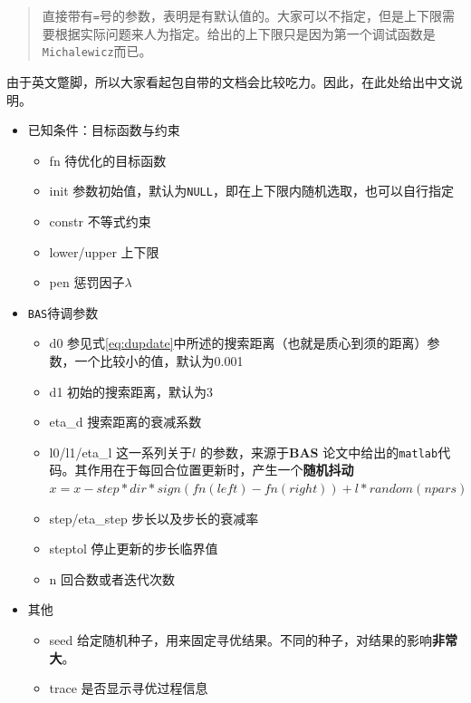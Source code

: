 \documentclass[]{ctexbook}
\providecommand{\tightlist}{%
  \setlength{\itemsep}{0pt}\setlength{\parskip}{0pt}}
\theoremstyle{definition}
\theoremstyle{definition}
\theoremstyle{definition}
\theoremstyle{remark}
\begin{document}
\begin{quote}
直接带有\texttt{=}号的参数，表明是有默认值的。大家可以不指定，但是上下限需要根据实际问题来人为指定。给出的上下限只是因为第一个调试函数是\texttt{Michalewicz}而已。
\end{quote}

由于英文蹩脚，所以大家看起包自带的文档会比较吃力。因此，在此处给出中文说明。

\begin{itemize}
\tightlist
\item
  已知条件：目标函数与约束

  \begin{itemize}
  \tightlist
  \item
    fn 待优化的目标函数
  \item
    init
    参数初始值，默认为\texttt{NULL}，即在上下限内随机选取，也可以自行指定
  \item
    constr 不等式约束
  \item
    lower/upper 上下限
  \item
    pen 惩罚因子\(\lambda\)
  \end{itemize}
\item
  \texttt{BAS}待调参数

  \begin{itemize}
  \tightlist
  \item
    d0
    参见式\eqref{eq:dupdate}中所述的搜索距离（也就是质心到须的距离）参数，一个比较小的值，默认为0.001
  \item
    d1 初始的搜索距离，默认为3
  \item
    eta\_d 搜索距离的衰减系数
  \item
    l0/l1/eta\_l 这一系列关于\(l\) 的参数，来源于\textbf{BAS}
    \citep{Jiang2017BAS}论文中给出的\texttt{matlab}代码。其作用在于每回合位置更新时，产生一个\textbf{随机抖动}\(x = x - step * dir * sign(fn(left) - fn(right)) + l *random(npars)\)
  \item
    step/eta\_step 步长以及步长的衰减率
  \item
    steptol 停止更新的步长临界值
  \item
    n 回合数或者迭代次数
  \end{itemize}
\item
  其他

  \begin{itemize}
  \tightlist
  \item
    seed
    给定随机种子，用来固定寻优结果。不同的种子，对结果的影响\textbf{非常大}。
  \item
    trace 是否显示寻优过程信息
  \end{itemize}
\end{itemize}
\end{document}
